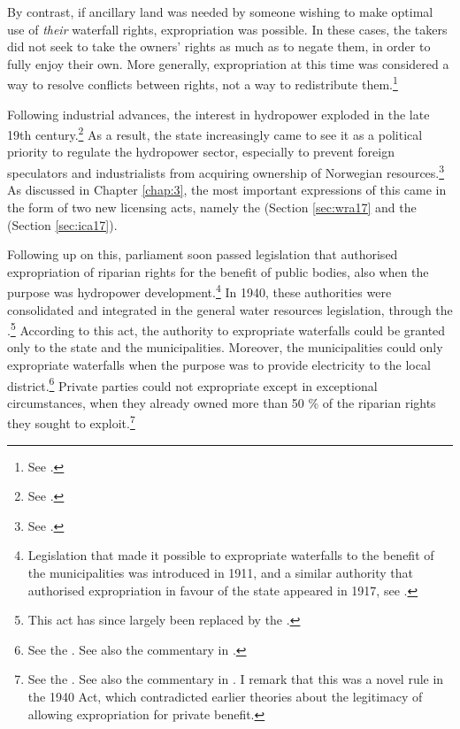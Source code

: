 By contrast, if ancillary land was needed by someone wishing to make optimal use of {\it their} waterfall rights, expropriation was possible. In these cases, the takers did not seek to take the owners' rights as much as to negate them, in order to fully enjoy their own. More generally, expropriation at this time was considered a way to resolve conflicts between rights, not a way to redistribute them.\footnote{See \cite[168-170]{dahl88}.}

Following industrial advances, the interest in hydropower exploded in the late 19th century.\footnote{See \cite[58-59]{falkanger87}.} As a result, the state increasingly came to see it as a political priority to regulate the hydropower sector, especially to prevent foreign speculators and industrialists from acquiring ownership of Norwegian resources.\footnote{See \cite[58-59]{falkanger87}.} As discussed in Chapter \ref{chap:3}, the most important expressions of this came in the form of two new licensing acts, namely the \cite{wra17} (Section \ref{sec:wra17} and the \cite{ica17} (Section \ref{sec:ica17}).


Following up on this, parliament soon passed legislation that authorised expropriation of riparian rights for the benefit of public bodies, also when the purpose was hydropower development.\footnote{Legislation that made it possible to expropriate waterfalls to the benefit of the municipalities was introduced in 1911, and a similar authority that authorised expropriation in favour of the state appeared in 1917, see \cite[29]{amundsen28}.} In 1940, these authorities were consolidated and integrated in the general water resources legislation, through the \cite{wra40}.\footnote{This act has since largely been replaced by the \cite{wra00}.} According to this act, the authority to expropriate waterfalls could be granted only to the state and the municipalities. Moreover, the municipalities could only expropriate waterfalls when the purpose was to provide electricity to the local district.\footnote{See the \cite[148]{wra40}. See also the commentary in \cite[201-210]{sorensen41}.} Private parties could not expropriate except in exceptional circumstances, when they already owned more than 50 \% of the riparian rights they sought to exploit.\footnote{See the \cite[55]{wra40}. See also the commentary in \cite[70-74]{sorensen41}. I remark that this was a novel rule in the 1940 Act, which contradicted earlier theories about the legitimacy of allowing expropriation for private benefit.} 

